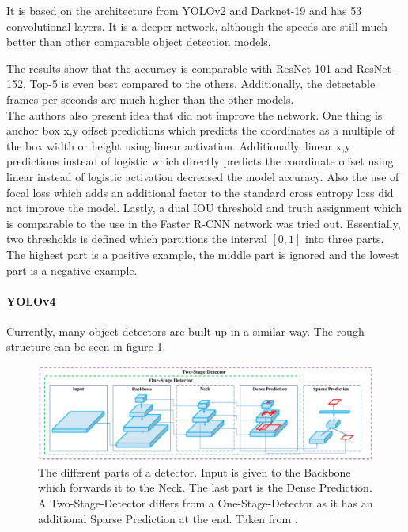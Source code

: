 It is based on the architecture from YOLOv2 and Darknet-19 and has 53 convolutional layers. It is a deeper network, although the speeds are still much better than other comparable object detection models. 

The results show that the accuracy is comparable with ResNet-101 and ResNet-152, Top-5 is even best compared to the others. Additionally, the detectable frames per seconds are much higher than the other models.\\

The authors also present idea that did not improve the network. One thing is anchor box x,y offset predictions which predicts the coordinates as a multiple of the box width or height using linear activation. Additionally, linear x,y predictions instead of logistic which directly predicts the coordinate offset using linear instead of logistic activation decreased the model accuracy. Also the use of focal loss which adds an additional factor to the standard cross entropy loss did not improve the model. Lastly, a dual IOU threshold and truth assignment which is comparable to the use in the Faster R-CNN network was tried out. Essentially, two thresholds is defined which partitions the interval $ [0,1] $ into three parts. The highest part is a positive example, the middle part is ignored and the lowest part is a negative example. 

\paragraph{YOLOv4}

Currently, many object detectors are built up in a similar way. The rough structure can be seen in figure \ref{fig:yolov4_architecture}.

\begin{figure}[htb!]
	\centering
	\includegraphics[scale=0.31]{figures/yolov4_architecture.png}
	\caption{The different parts of a detector. Input is given to the Backbone which forwards it to the Neck. The last part is the Dense Prediction. A Two-Stage-Detector differs from a One-Stage-Detector as it has an additional Sparse Prediction at the end. Taken from \cite{yolov4}.}
	\label{fig:yolov4_architecture}
\end{figure}

